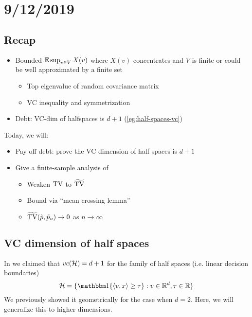 \section{9/12/2019}

\subsection{Recap}

\begin{itemize}
    \item Bounded $\mathbb{E} \sup_{v \in V} X(v)$ where $X(v)$ concentrates
        and $V$ is finite or could be well approximated by a finite set
        \begin{itemize}
            \item Top eigenvalue of random covariance matrix
            \item VC inequality and symmetrization
        \end{itemize}
    \item Debt: VC-dim of halfspaces is $d+1$ (\cref{eg:half-spaces-vc})
\end{itemize}
Today, we will:
\begin{itemize}
    \item Pay off debt: prove the VC dimension of half spaces is $d+1$
    \item Give a finite-sample analysis of 
    \begin{itemize}
        \item Weaken $\operatorname{TV}$ to $\widetilde{\operatorname{TV}}$
        \item Bound  via ``mean crossing lemma''
        \item $\widetilde{\operatorname{TV}}(\tilde{p}, \tilde{p}_n) \to 0$ as $n \to \infty$
    \end{itemize}
\end{itemize}

\subsection{VC dimension of half spaces}

In  we claimed that $vc(\mathcal{H}) = d+1$ for
the family of half spaces (i.e. linear decision boundaries)
\begin{align}
    \cH = \{ \ind\{\braket{v,x} \geq \tau\} : v \in \RR^d, \tau \in \RR\}
\end{align}
We previously showed it geometrically for the case when $d=2$.
Here, we will generalize this to higher dimensions.

